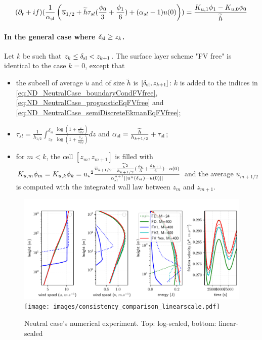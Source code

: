 \begin{equation}
	\label{eq:ND_NeutralCase_semiDiscreteEkmanEqFVfree}
	(\partial_t+if) (\frac{1}{\alpha_{\rm sl}}
	\left(\overline{u}_{1/2} + \widetilde{h}\tau_{sl}
	(\frac{\phi_0}{3} + \frac{\phi_1}{6})
	+ (\alpha_{sl} - 1) u(0)
	\right))
= \frac{K_{u, 1}\phi_1 - K_{u,0} \phi_0}{\widetilde{h}}
\end{equation}
\paragraph{In the general case where $\delta_{\rm sl} \geq z_k$.}
Let $k$ be such that $z_k \leq \delta_{\rm sl} < z_{k+1}$.
The surface layer scheme "FV free" is identical to the case $k=0$, except that
\begin{itemize}
	\item the subcell of average $\widetilde{u}$ and of size
		$\widetilde{h}$ is $[\delta_{\rm sl}, z_{k+1}]$:
		$k$ is added to the indices in 
		\eqref{eq:ND_NeutralCase_boundaryCondFVfree},
		\eqref{eq:ND_NeutralCase_prognosticEqFVfree} and
		\eqref{eq:ND_NeutralCase_semiDiscreteEkmanEqFVfree};
	\item $\tau_{sl} = \frac{1}{{h_{1/2}}}\int_{z_k}^{\delta_{sl}} \frac{\log(1+\frac{z}{z_{0M}})}{\log(1+\frac{\delta_{sl}}{z_{0M}})} dz$ and $\alpha_{\rm sl} = \frac{\widetilde{h}}{h_{k+1/2}} + \tau_{\rm sl}$;
	\item for $m < k$, the cell $[z_m, z_{m+1}]$ is filled with
		$K_{u,m} \phi_m = K_{u,k}\phi_k =
	{u_\star}^2 \frac{\overline{u}_{k+1/2} -
		\frac{\widetilde{h}^2}{h_{k+1/2}}
		(\frac{\phi_k}{3} + \frac{\phi_{k+1}}{6})-u(0)}
		{\alpha_{\rm sl}^{n+1}||u^n(\delta_{sl})-u(0)||}$
		and the average $\overline{u}_{m+1/2}$
		is computed with the integrated wall law
		between $z_m$ and $z_{m+1}$.
	
\end{itemize}
\begin{figure}
	\centering
	\includegraphics[scale=0.55]{images/consistency_comparison.pdf}
	\texttt{[image: images/consistency\_comparison\_linearscale.pdf]}
	\caption{Neutral case's numerical experiment. Top: log-scaled, bottom: linear-scaled}
	\label{fig:ND_NeutralCase_NumericalExp}
\end{figure}
